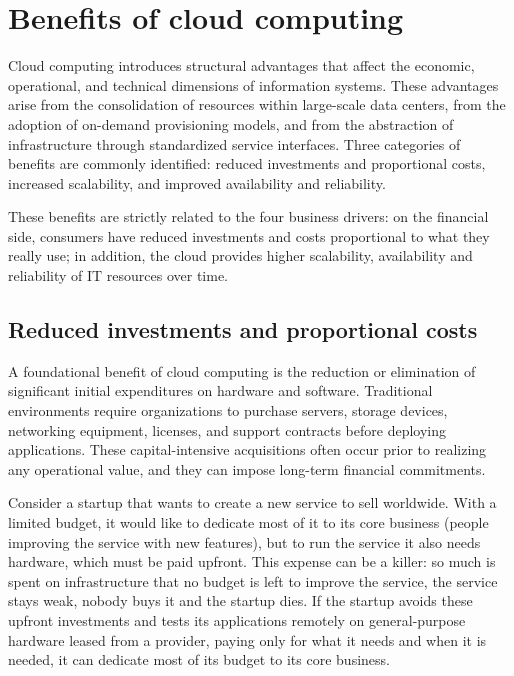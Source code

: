\documentclass[11pt,a4paper,openany]{report}
\begin{document}
\section{Benefits of cloud computing}

Cloud computing introduces structural advantages that affect the economic, operational, and technical dimensions of information systems. These advantages arise from the consolidation of resources within large-scale data centers, from the adoption of on-demand provisioning models, and from the abstraction of infrastructure through standardized service interfaces. Three categories of benefits are commonly identified: reduced investments and proportional costs, increased scalability, and improved availability and reliability.

These benefits are strictly related to the four business drivers: on the financial side, consumers have reduced investments and costs proportional to what they really use; in addition, the cloud provides higher scalability, availability and reliability of IT resources over time.

\subsection{Reduced investments and proportional costs}

A foundational benefit of cloud computing is the reduction or elimination of significant initial expenditures on hardware and software. Traditional environments require organizations to purchase servers, storage devices, networking equipment, licenses, and support contracts before deploying applications. These capital-intensive acquisitions often occur prior to realizing any operational value, and they can impose long-term financial commitments.

Consider a startup that wants to create a new service to sell worldwide. With a limited budget, it would like to dedicate most of it to its core business (people improving the service with new features), but to run the service it also needs hardware, which must be paid upfront. This expense can be a killer: so much is spent on infrastructure that no budget is left to improve the service, the service stays weak, nobody buys it and the startup dies. If the startup avoids these upfront investments and tests its applications remotely on general-purpose hardware leased from a provider, paying only for what it needs and when it is needed, it can dedicate most of its budget to its core business.
\end{document}
